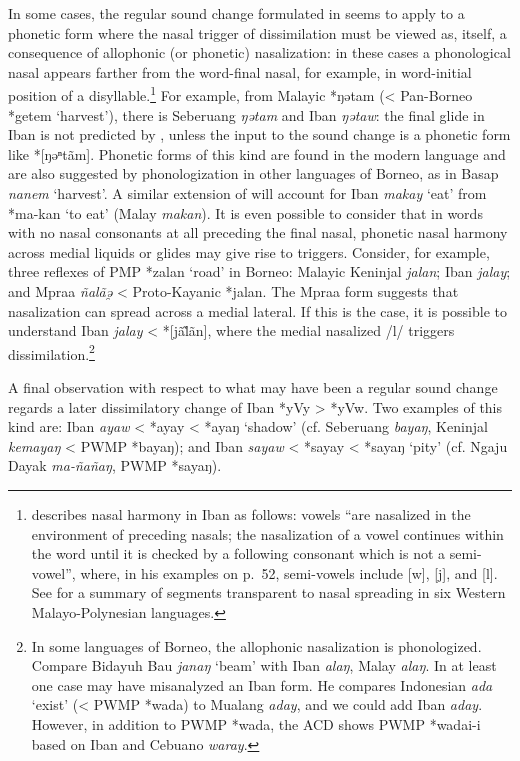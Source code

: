 \documentclass[output=paper]{langscibook}
\begin{document}
\largerpage[-1]
In some cases, the regular sound change formulated in  seems to apply to a phonetic form where the nasal trigger of dissimilation must be viewed as, itself, a consequence of allophonic (or phonetic) nasalization: in these cases a phonological nasal appears farther from the word-final nasal, for example, in word-initial position of a disyllable.\footnote{\citet[51]{Omar1969} describes nasal harmony in Iban as follows: vowels “are nasalized in the environment of preceding nasals; the nasalization of a vowel continues within the word until it is checked by a following consonant which is not a semi-vowel”, where, in his examples on p.~52, semi-vowels include [w], [j], and [l]. See \citet[239]{Blust2013} for a summary of segments transparent to nasal spreading in six Western Malayo-Polynesian languages.} For example, from Malayic *ŋətam (< Pan-Borneo *getem ‘harvest’), there is Seberuang \textit{ŋətam} and Iban \textit{ŋətaw}: the final glide in Iban is not predicted by , unless the input to the sound change is a phonetic form like *[ŋəⁿtãm]. Phonetic forms of this kind are found in the modern language \citep{Blust1997} and are also suggested by phonologization in other languages of Borneo, as in Basap \textit{nanem} ‘harvest’.
\largerpage[-1]
A similar extension of  will account for Iban \textit{makay} ‘eat’ from *ma-kan ‘to eat’ (Malay \textit{makan}). It is even possible to consider that in words with no nasal consonants at all preceding the final nasal, phonetic nasal harmony across medial liquids or glides may give rise to triggers. Consider, for example, three reflexes of PMP *zalan ‘road’ in Borneo: Malayic Keninjal \textit{jalan}; Iban \textit{jalay}; and Mpraa \textit{ñalãə̯} < Proto-Kayanic *jalan. The Mpraa form suggests that nasalization can spread across a medial lateral. If this is the case, it is possible to understand Iban \textit{jalay} < *[jã\~{l}ãn], where the medial nasalized \mbox{/l/} triggers dissimilation.\footnote{In some languages of Borneo, the allophonic nasalization is phonologized. Compare Bidayuh Bau \textit{janaŋ} ‘beam’ with Iban \textit{alaŋ}, Malay \textit{alaŋ}.  In at least one case \citet[195]{Smith2017} may have misanalyzed an Iban form. He compares Indonesian \textit{ada} ‘exist’ (< PWMP *wada) to Mualang \textit{aday}, and we could add Iban \textit{aday}. However, in addition to PWMP *wada, the ACD shows PWMP *wadai-i based on Iban and Cebuano \textit{waray}.}

\begin{sloppypar}
A final observation with respect to what may have been a regular sound change regards a later dissimilatory change of Iban *yVy > *yVw. Two examples of this kind are:  Iban \textit{ayaw} < *ayay < *ayaŋ ‘shadow’ (cf. Seberuang \textit{bayaŋ}, Keninjal \textit{kemayaŋ} < PWMP *bayaŋ); and Iban \textit{sayaw} < *sayay < *sayaŋ ‘pity’ (cf. Ngaju Dayak \textit{ma-ñañaŋ}, PWMP *sayaŋ).
\end{sloppypar}
\end{document}
